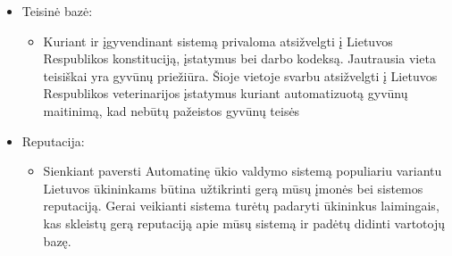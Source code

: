 \documentclass[oneside]{VUMIFPSkursinis}
\begin{document}
\begin{itemize}
\begin{itemize}
		\end{itemize}
		\item{Teisinė bazė: }
		\begin{itemize}
			\item{Kuriant ir įgyvendinant sistemą privaloma atsižvelgti į Lietuvos Respublikos konstituciją, įstatymus bei darbo kodeksą. Jautrausia vieta teisiškai yra gyvūnų priežiūra. Šioje vietoje svarbu atsižvelgti į Lietuvos Respublikos veterinarijos įstatymus kuriant automatizuotą gyvūnų maitinimą, kad nebūtų pažeistos gyvūnų teisės }
		\end{itemize}
		\item{Reputacija: }
		\begin{itemize}
			\item{Sienkiant paversti Automatinę ūkio valdymo sistemą populiariu variantu Lietuvos ūkininkams būtina užtikrinti gerą mūsų įmonės bei sistemos reputaciją. Gerai veikianti sistema turėtų padaryti ūkininkus laimingais, kas skleistų gerą reputaciją apie mūsų sistemą ir padėtų didinti vartotojų bazę. }
		\end{itemize}
	\end{itemize}
	
	
\end{document}
